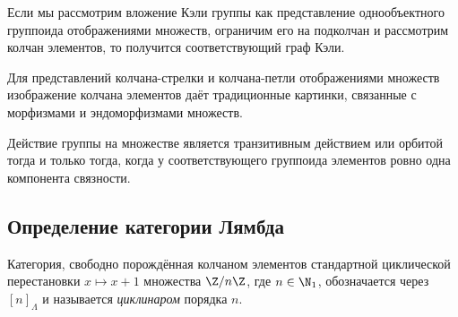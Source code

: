\documentclass[
	extrafontsizes,
	11pt,
	hyphens,
]{memoir}
\begin{document}

\begin{example}
Если мы рассмотрим вложение Кэли группы как представление однообъектного группоида отображениями множеств, ограничим его на подколчан и рассмотрим колчан элементов, то получится соответствующий граф Кэли.
\end{example}

\begin{example}
Для представлений колчана-стрелки и колчана-петли отображениями множеств изображение колчана элементов даёт традиционные картинки, связанные с морфизмами и эндоморфизмами множеств.
\end{example}


\begin{example}%
Действие группы на множестве является {транзитивным действием} или {орбитой}
тогда и только тогда, когда у соответствующего группоида элементов ровно одна компонента связности.
\end{example}

\subsection{Определение категории Лямбда}

\begin{definition}%
[\scshape Циклинар]
Категория, свободно порождённая колчаном элементов стандартной циклической перестановки
\(x \mapsto x+1\) множества \(\Z/n\Z\),
где \(n \in \N_1\), обозначается через \([n]_\Lambda\) и называется
\emph{циклинаром}
порядка \(n\).
\end{definition}
\end{document}
